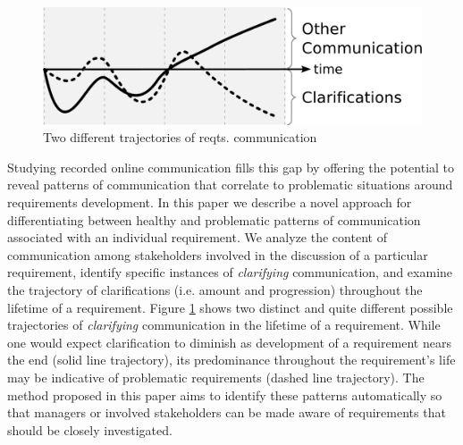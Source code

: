 \begin{figure}[h]
\begin{center}
\includegraphics[width=0.7\columnwidth]{img/basic-pattern}
\caption{Two different trajectories of reqts. communication}
\label{fig:basic-pattern}
\end{center}
\end{figure}

Studying recorded online communication fills this gap by offering the potential to reveal patterns of communication that correlate to problematic situations around requirements development. In this paper we describe a novel approach for differentiating between healthy and problematic patterns of communication associated with an individual requirement. We analyze the content of communication among stakeholders involved in the discussion of a particular requirement, identify specific instances of \emph{clarifying} communication, and examine the trajectory of clarifications (i.e. amount and progression) throughout the lifetime of a requirement. Figure \ref{fig:basic-pattern} shows two distinct and quite different possible trajectories of \emph{clarifying} communication in the lifetime of a requirement. While one would expect clarification to diminish as development of a requirement nears the end (solid line trajectory), its predominance throughout the requirement's life may be indicative of problematic requirements (dashed line trajectory). The method proposed in this paper aims to identify these patterns automatically so that managers or involved stakeholders can be made aware of requirements that should be closely investigated.



